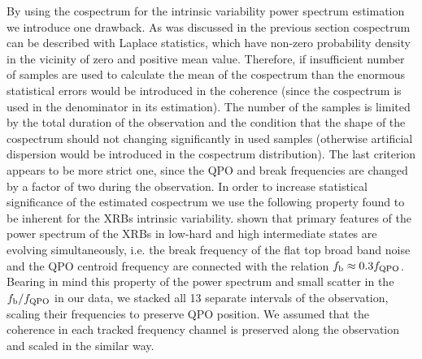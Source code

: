 \documentclass[a4paper,fleqn,usenatbib]{mnras}
\begin{document}
By using the cospectrum for the intrinsic variability power spectrum estimation we introduce one drawback. 
As was discussed in the previous section cospectrum can be described with Laplace statistics, which have non-zero probability density in the vicinity of zero and positive mean value.
Therefore, if insufficient number of samples are used to calculate the mean of the cospectrum than the enormous statistical errors would be introduced in the coherence (since the cospectrum is used in the denominator in its estimation).
The number of the samples is limited by the total duration of the observation and the condition that the shape of the cospectrum should not changing significantly in used samples (otherwise artificial dispersion would be introduced in the cospectrum distribution).
The last criterion appears to be more strict one, since the QPO and break frequencies are changed by a factor of two during the observation.
In order to increase statistical significance of the estimated cospectrum we use the following property found to be inherent for the XRBs intrinsic variability. 
\citet{wijnands99} shown that primary features of the power spectrum of the XRBs in low-hard and high intermediate states are evolving simultaneously, i.e. the break frequency of the flat top broad band noise and the QPO centroid frequency are connected with the relation $f_{\rm b} \approx 0.3 f_{\rm QPO}$.
Bearing in mind this property of the power spectrum and small scatter in the $f_{\rm b}/f_{\rm QPO}$ in our data, we stacked all 13 separate intervals of the observation, scaling their frequencies to preserve QPO position. 
We assumed that the coherence in each tracked frequency channel is preserved along the observation and scaled in the similar way.
\end{document}
